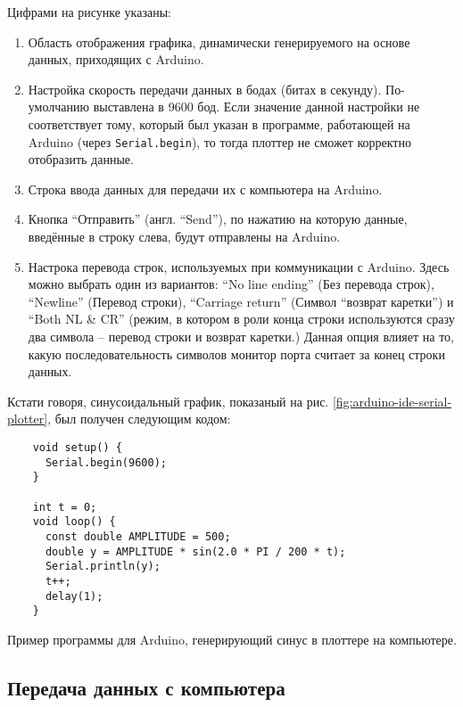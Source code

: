 \documentclass[../sparc.tex]{subfiles}
\begin{document}
Цифрами на рисунке указаны:

\begin{enumerate}
\item Область отображения графика, динамически генерируемого на основе данных,
  приходящих с Arduino.
\item Настройка скорость передачи данных в бодах (битах в секунду).
  По-умолчанию выставлена в 9600 бод.  Если значение данной настройки не
  соответствует тому, который был указан в программе, работающей на Arduino
  (через \texttt{Serial.begin}), то тогда плоттер не сможет корректно отобразить
  данные.
\item Строка ввода данных для передачи их с компьютера на Arduino.
\item Кнопка ``Отправить'' (англ. ``Send''), по нажатию на которую данные,
  введённые в строку слева, будут отправлены на Arduino.
\item Настрока перевода строк, используемых при коммуникации с Arduino.  Здесь
  можно выбрать один из вариантов: ``No line ending'' (Без перевода строк),
  ``Newline'' (Перевод строки), ``Carriage return'' (Символ ``возврат каретки'')
  и ``Both NL \& CR'' (режим, в котором в роли конца строки используются сразу
  два символа -- перевод строки и возврат каретки.)  Данная опция влияет на то,
  какую последовательность символов монитор порта считает за конец строки
  данных.
\end{enumerate}

\newpage

Кстати говоря, синусоидальный график, показаный на
рис. \ref{fig:arduino-ide-serial-plotter}, был получен следующим кодом:

\begin{listing}[ht]
  \begin{verbatim}
    void setup() {
      Serial.begin(9600);
    }

    int t = 0;
    void loop() {
      const double AMPLITUDE = 500;
      double y = AMPLITUDE * sin(2.0 * PI / 200 * t);
      Serial.println(y);
      t++;
      delay(1);
    }
  \end{verbatim}
  \label{listing:serial-port-sine-wave-example}
  \caption{Пример программы для Arduino, генерирующий синус в плоттере на
    компьютере.}
\end{listing}

\subsection{Передача данных с компьютера}
\end{document}
